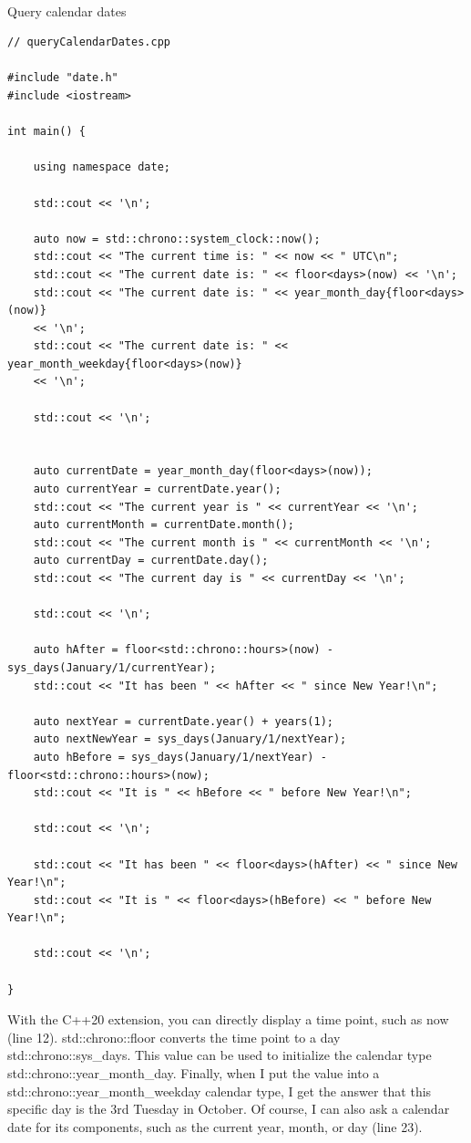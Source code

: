 \hspace*{\fill} \\ %
\noindent
Query calendar dates
\begin{lstlisting}[style=styleCXX]
// queryCalendarDates.cpp

#include "date.h"
#include <iostream>

int main() {
	
	using namespace date;
	
	std::cout << '\n';
	
	auto now = std::chrono::system_clock::now();
	std::cout << "The current time is: " << now << " UTC\n";
	std::cout << "The current date is: " << floor<days>(now) << '\n';
	std::cout << "The current date is: " << year_month_day{floor<days>(now)}
	<< '\n';
	std::cout << "The current date is: " << year_month_weekday{floor<days>(now)}
	<< '\n';
	
	std::cout << '\n';
	
	
	auto currentDate = year_month_day(floor<days>(now));
	auto currentYear = currentDate.year();
	std::cout << "The current year is " << currentYear << '\n';
	auto currentMonth = currentDate.month();
	std::cout << "The current month is " << currentMonth << '\n';
	auto currentDay = currentDate.day();
	std::cout << "The current day is " << currentDay << '\n';
	
	std::cout << '\n';
	
	auto hAfter = floor<std::chrono::hours>(now) - sys_days(January/1/currentYear);
	std::cout << "It has been " << hAfter << " since New Year!\n";
	
	auto nextYear = currentDate.year() + years(1);
	auto nextNewYear = sys_days(January/1/nextYear);
	auto hBefore = sys_days(January/1/nextYear) - floor<std::chrono::hours>(now);
	std::cout << "It is " << hBefore << " before New Year!\n";
	
	std::cout << '\n';
	
	std::cout << "It has been " << floor<days>(hAfter) << " since New Year!\n";
	std::cout << "It is " << floor<days>(hBefore) << " before New Year!\n";
	
	std::cout << '\n';
	
}
\end{lstlisting}

With the C++20 extension, you can directly display a time point, such as now (line 12). std::chrono::floor converts the time point to a day std::chrono::sys\_days. This value can be used to initialize the calendar type std::chrono::year\_month\_day. Finally, when I put the value into a std::chrono::year\_month\_weekday calendar type, I get the answer that this specific day is the 3rd Tuesday in October. Of course, I can also ask a calendar date for its components, such as the current year, month, or day (line 23).

